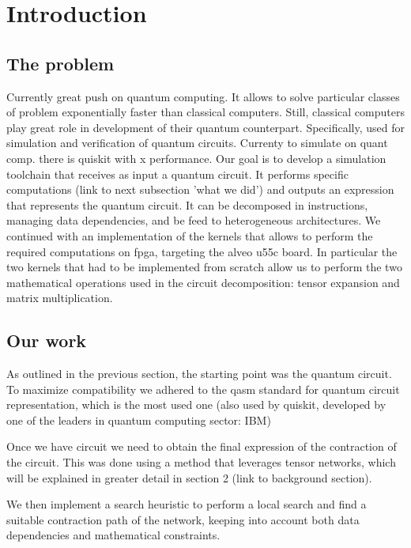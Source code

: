\documentclass[12pt,oneside,a4paper]{article}
\begin{document}
\newpage
\tableofcontents
\newpage

\section{Introduction}


\subsection{The problem}
Currently great push on quantum computing. It allows to solve particular classes of problem exponentially faster than classical computers. 
Still, classical computers play great role in development of their quantum counterpart. Specifically, used for simulation and verification of quantum circuits. 
Currenty to simulate on quant comp. there is quiskit with x performance.
Our goal is to develop a simulation toolchain that receives as input a quantum circuit. It performs specific computations (link to next subsection 'what we did') and outputs an expression that represents the quantum circuit. It can be decomposed in instructions, managing data dependencies, and be feed to heterogeneous architectures.
We continued with an implementation of the kernels that allows to perform the required computations on fpga, targeting the alveo u55c board. In particular the two kernels that had to be implemented from scratch allow us to perform the two mathematical operations used in the circuit decomposition: tensor expansion and matrix multiplication. 


\subsection{Our work}
As outlined in the previous section, the starting point was the quantum circuit.
To maximize compatibility we adhered to the qasm standard for quantum circuit representation, which is the most used one (also used by quiskit, developed by one of the leaders in quantum computing sector: IBM)

Once we have circuit we need to obtain the final expression of the contraction of the circuit. This was done using a method that leverages tensor networks, which will be explained in greater detail in section 2 (link to background section).

We then implement a search heuristic to perform a local search and find a suitable contraction path of the network, keeping into account both data dependencies and mathematical constraints.
\end{document}
